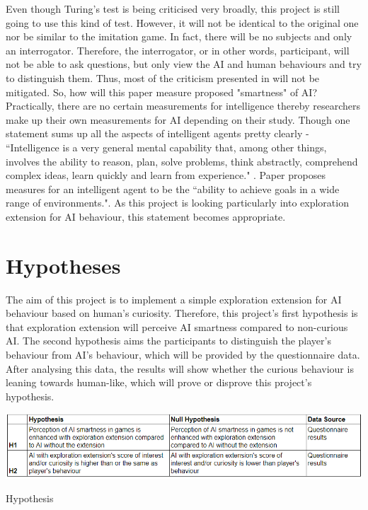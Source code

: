 \documentclass[journal]{IEEEtran}
\begin{document}
Even though Turing's test is being criticised very broadly, this project is still going to use this kind of test. However, it will not be identical to the original one nor be similar to the imitation game. In fact, there will be no subjects and only an interrogator. Therefore, the interrogator, or in other words, participant, will not be able to ask questions, but only view the AI and human behaviours and try to distinguish them. Thus, most of the criticism presented in \cite{hayes1995turing}\cite{sweeney2003s}\cite{crockett1994turing}\cite{livingstone2006turing} will not be mitigated. So, how will this paper measure proposed "smartness" of AI? Practically, there are no certain measurements for intelligence thereby researchers make up their own measurements for AI depending on their study. Though one statement sums up all the aspects of intelligent agents pretty clearly - ``Intelligence is a very general mental capability that, among other things, involves the ability to reason, plan, solve problems, think abstractly, comprehend complex ideas, learn quickly and learn from experience." \cite{gottfredson1997mainstream}. Paper \cite{legg2007universal} proposes measures for an intelligent agent to be the ``ability to achieve goals in a wide range of environments.". As this project is looking particularly into exploration extension for AI behaviour, this statement becomes appropriate. %

\section{Hypotheses} %
The aim of this project is to implement a simple exploration extension for AI behaviour based on human's curiosity. Therefore, this project's first hypothesis is that exploration extension will perceive AI smartness compared to non-curious AI. The second hypothesis aims the participants to distinguish the player's behaviour from AI's behaviour, which will be provided by the questionnaire data. After analysing this data, the results will show whether the curious behaviour is leaning towards human-like, which will prove or disprove this project's hypothesis.%

\begin{table}
	\includegraphics[width=\linewidth]{Images/Hypothesis.PNG}
	\caption{Hypothesis}
	\label{tab:hypothesis}
\end{table}
\end{document}
